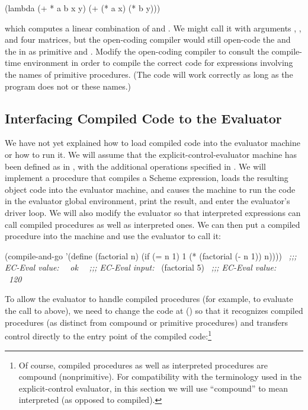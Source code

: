 \begin{exerciseGroup}
\begin{codeBlock}
(lambda (+ * a b x y)
  (+ (* a x) (* b y)))
\end{codeBlock}

\noindent
which computes a linear combination of  and .  We might call it
with arguments , , and four matrices, but the
open-coding compiler would still open-code the \code{+} and the \code{*} in
 as primitive \code{+} and \code{*}.  Modify the
open-coding compiler to consult the compile-time environment in order to
compile the correct code for expressions involving the names of primitive
procedures.  (The code will work correctly as long as the program does not
 or  these names.)
\end{exerciseGroup}

\subsection{Interfacing Compiled Code to the Evaluator}
\label{Section 5.5.7}

We have not yet explained how to load compiled code into the evaluator machine
or how to run it.  We will assume that the explicit-control-evaluator machine
has been defined as in , with the additional operations
specified in .  We will implement a procedure
 that compiles a Scheme expression, loads the resulting
object code into the evaluator machine, and causes the machine to run the code
in the evaluator global environment, print the result, and enter the
evaluator's driver loop.  We will also modify the evaluator so that interpreted
expressions can call compiled procedures as well as interpreted ones.  We can
then put a compiled procedure into the machine and use the evaluator to call
it:

\begin{codeBlock}
(compile-and-go
 '(define (factorial n)
    (if (= n 1)
        1
        (* (factorial (- n 1)) n))))
~\textit{;;; EC-Eval value:}~
~\textit{ok}~
~\textit{;;; EC-Eval input:}~
(factorial 5)
~\textit{;;; EC-Eval value:}~
~\textit{120}~
\end{codeBlock}

\noindent
To allow the evaluator to handle compiled procedures (for example, to evaluate
the call to  above), we need to change the code at
 () so that it recognizes compiled
procedures (as distinct from compound or primitive procedures) and transfers
control directly to the entry point of the compiled code:\footnote{Of course,
compiled procedures as well as interpreted procedures are compound
(nonprimitive).  For compatibility with the terminology used in the
explicit-control evaluator, in this section we will use ``compound'' to mean
interpreted (as opposed to compiled).}

